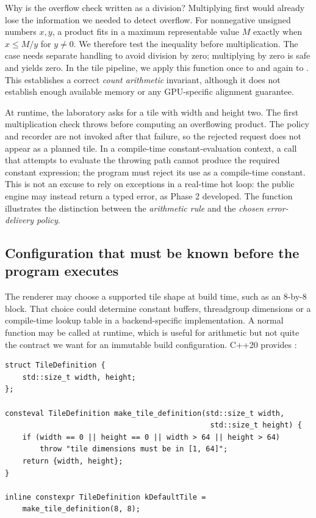 Why is the overflow check written as a division? Multiplying first would already lose the information we needed to detect overflow. For nonnegative unsigned numbers \(x,y\), a product fits in a maximum representable value \(M\) exactly when \(x\le M/y\) for \(y\ne0\). We therefore test the inequality before multiplication. The  case needs separate handling to avoid division by zero; multiplying by zero is safe and yields zero. In the tile pipeline, we apply this function once to  and again to . This establishes a correct \emph{count arithmetic} invariant, although it does not establish enough available memory or any GPU-specific alignment guarantee.

At runtime, the laboratory asks for a tile with width  and height two. The first multiplication check throws before computing an overflowing product. The policy and recorder are not invoked after that failure, so the rejected request does not appear as a planned tile. In a compile-time constant-evaluation context, a call that attempts to evaluate the throwing path cannot produce the required constant expression; the program must reject its use as a compile-time constant. This is not an excuse to rely on exceptions in a real-time hot loop: the public engine may instead return a typed error, as Phase 2 developed. The function illustrates the distinction between the \emph{arithmetic rule} and the \emph{chosen error-delivery policy}.

\subsection{Configuration that must be known before the program executes}\label{05-engine-i-ch005-configuration-that-must-be-known-before-the-program-executes}

\hypertarget{05-engine-i-ch005-configuration-that-must-be-known-before-the-program-executes}{}

The renderer may choose a supported tile shape at build time, such as an 8-by-8 block. That choice could determine constant buffers, threadgroup dimensions or a compile-time lookup table in a backend-specific implementation. A normal  function may be called at runtime, which is useful for arithmetic but not quite the contract we want for an immutable build configuration. C++20 provides :

\begin{verbatim}
struct TileDefinition {
    std::size_t width, height;
};

consteval TileDefinition make_tile_definition(std::size_t width,
                                               std::size_t height) {
    if (width == 0 || height == 0 || width > 64 || height > 64)
        throw "tile dimensions must be in [1, 64]";
    return {width, height};
}

inline constexpr TileDefinition kDefaultTile =
    make_tile_definition(8, 8);
\end{verbatim}

